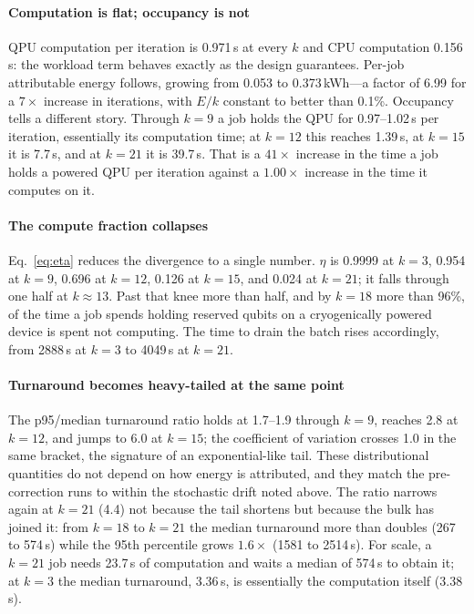 \paragraph{Computation is flat; occupancy is not}
QPU computation per iteration is 0.971\,s at every $k$ and CPU computation
0.156\,s: the workload term behaves exactly as the design guarantees. Per-job
attributable energy follows, growing from 0.053 to 0.373\,kWh---a factor of
6.99 for a $7\times$ increase in iterations, with $E/k$ constant to
better than 0.1\%. Occupancy tells a different story. Through $k=9$ a job holds the QPU
for 0.97--1.02\,s per iteration, essentially its computation time; at $k=12$
this reaches 1.39\,s, at $k=15$ it is 7.7\,s, and at $k=21$ it is
39.7\,s. That is a $41\times$ increase in the time a job holds a powered
QPU per iteration against a $1.00\times$ increase in the time it computes on
it.

\paragraph{The compute fraction collapses}
Eq.~\eqref{eq:eta} reduces the divergence to a single number. $\eta$ is
0.9999 at $k=3$, 0.954 at $k=9$, 0.696 at $k=12$, 0.126 at $k=15$, and
0.024 at $k=21$; it falls through one half at $k\approx13$. Past that knee
more than half, and by $k=18$ more than 96\%, of the time a job spends
holding reserved qubits on a cryogenically powered device is spent not
computing. The time to drain the batch rises accordingly, from 2888\,s at
$k=3$ to 4049\,s at $k=21$.

\paragraph{Turnaround becomes heavy-tailed at the same point}
The p95/median turnaround ratio holds at 1.7--1.9 through $k=9$, reaches 2.8
at $k=12$, and jumps to 6.0 at $k=15$; the coefficient of variation crosses
1.0 in the same bracket, the signature of an exponential-like tail. These
distributional quantities do not depend on how energy is attributed, and they
match the pre-correction runs to within the stochastic drift noted above.
The ratio narrows again at $k=21$ (4.4) not because the tail shortens but
because the bulk has joined it: from $k=18$ to $k=21$ the median turnaround
more than doubles (267 to 574\,s) while the 95th percentile grows
$1.6\times$ (1581 to 2514\,s). For scale, a $k=21$ job needs 23.7\,s of
computation and waits a median of 574\,s to obtain it; at $k=3$ the median
turnaround, 3.36\,s, is essentially the computation itself (3.38\,s).

